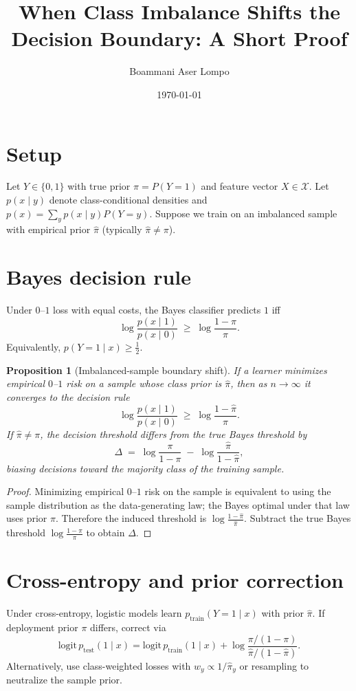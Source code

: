\documentclass[11pt]{article}
\title{When Class Imbalance Shifts the Decision Boundary: A Short Proof}
\author{Boammani Aser Lompo}
\date{\today}
\newtheorem{proposition}{Proposition}
\begin{document}
\maketitle

\section{Setup}
Let $Y\in\{0,1\}$ with true prior $\pi = P(Y=1)$ and feature vector $X\in\mathcal{X}$. 
Let $p(x\mid y)$ denote class-conditional densities and $p(x)=\sum_y p(x\mid y)P(Y=y)$.
Suppose we train on an imbalanced sample with empirical prior $\hat\pi$ (typically $\hat\pi\neq\pi$).

\section{Bayes decision rule}
Under $0$--$1$ loss with equal costs, the Bayes classifier predicts $1$ iff
\[
\log \frac{p(x\mid 1)}{p(x\mid 0)} \;\ge\; \log\frac{1-\pi}{\pi}.
\]
Equivalently, $p(Y\!=\!1\mid x)\ge \tfrac12$.

\begin{proposition}[Imbalanced-sample boundary shift]
If a learner minimizes empirical $0$--$1$ risk on a sample whose class prior is $\hat\pi$, then as $n\to\infty$ it converges to the decision rule
\[
\log \frac{p(x\mid 1)}{p(x\mid 0)} \;\ge\; \log\frac{1-\hat\pi}{\hat\pi}.
\]
If $\hat\pi\neq\pi$, the decision threshold differs from the true Bayes threshold by
\[
\Delta \;=\; \log\frac{\pi}{1-\pi} \;-\; \log\frac{\hat\pi}{1-\hat\pi},
\]
biasing decisions toward the majority class of the training sample.
\end{proposition}

\begin{proof}
Minimizing empirical $0$--$1$ risk on the sample is equivalent to using the sample distribution as the data-generating law; the Bayes optimal under that law uses prior $\hat\pi$. 
Therefore the induced threshold is $\log\frac{1-\hat\pi}{\hat\pi}$.
Subtract the true Bayes threshold $\log\frac{1-\pi}{\pi}$ to obtain $\Delta$.
\end{proof}

\section{Cross-entropy and prior correction}
Under cross-entropy, logistic models learn $p_{\text{train}}(Y\!=\!1\mid x)$ with prior $\hat\pi$.
If deployment prior $\pi$ differs, correct via
\[
\text{logit}\,p_{\text{test}}(1\mid x)
=
\text{logit}\,p_{\text{train}}(1\mid x)
+
\log\frac{\pi/(1-\pi)}{\hat\pi/(1-\hat\pi)}.
\]
Alternatively, use class-weighted losses with $w_y \propto 1/\hat\pi_y$ or resampling to neutralize the sample prior.
\end{document}
